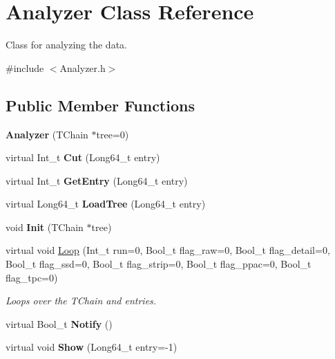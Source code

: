 \hypertarget{classAnalyzer}{
\section{Analyzer Class Reference}
\label{classAnalyzer}
}


Class for analyzing the data.  




{\ttfamily \#include $<$Analyzer.h$>$}

\subsection*{Public Member Functions}
\begin{DoxyCompactItemize}
\item 
\hypertarget{classAnalyzer_a04237ea5580940cce0d009fbffcf282c}{
{\bfseries Analyzer} (TChain $\ast$tree=0)}
\label{classAnalyzer_a04237ea5580940cce0d009fbffcf282c}

\item 
\hypertarget{classAnalyzer_ace4ea5e2c3885c124fd694d21b466d5f}{
virtual Int\_\-t {\bfseries Cut} (Long64\_\-t entry)}
\label{classAnalyzer_ace4ea5e2c3885c124fd694d21b466d5f}

\item 
\hypertarget{classAnalyzer_a99e765e874179f03ea33b7f343af5b3b}{
virtual Int\_\-t {\bfseries GetEntry} (Long64\_\-t entry)}
\label{classAnalyzer_a99e765e874179f03ea33b7f343af5b3b}

\item 
\hypertarget{classAnalyzer_acacc1aed99754d5f109e8aa0770f9667}{
virtual Long64\_\-t {\bfseries LoadTree} (Long64\_\-t entry)}
\label{classAnalyzer_acacc1aed99754d5f109e8aa0770f9667}

\item 
\hypertarget{classAnalyzer_aad4ad117a85b53307b0428348f821b3a}{
void {\bfseries Init} (TChain $\ast$tree)}
\label{classAnalyzer_aad4ad117a85b53307b0428348f821b3a}

\item 
virtual void \hyperlink{classAnalyzer_a076d7593609882a46a8c3ca60ecd5e9f}{Loop} (Int\_\-t run=0, Bool\_\-t flag\_\-raw=0, Bool\_\-t flag\_\-detail=0, Bool\_\-t flag\_\-ssd=0, Bool\_\-t flag\_\-strip=0, Bool\_\-t flag\_\-ppac=0, Bool\_\-t flag\_\-tpc=0)
\begin{DoxyCompactList}\small\item\em Loops over the TChain and entries. \end{DoxyCompactList}\item 
\hypertarget{classAnalyzer_aae8b33446a48876027e1740cfbdb62c4}{
virtual Bool\_\-t {\bfseries Notify} ()}
\label{classAnalyzer_aae8b33446a48876027e1740cfbdb62c4}

\item 
\hypertarget{classAnalyzer_a13b54c5dafedb38099cea8bbb3afe9ee}{
virtual void {\bfseries Show} (Long64\_\-t entry=-\/1)}
\label{classAnalyzer_a13b54c5dafedb38099cea8bbb3afe9ee}

\end{DoxyCompactItemize}
